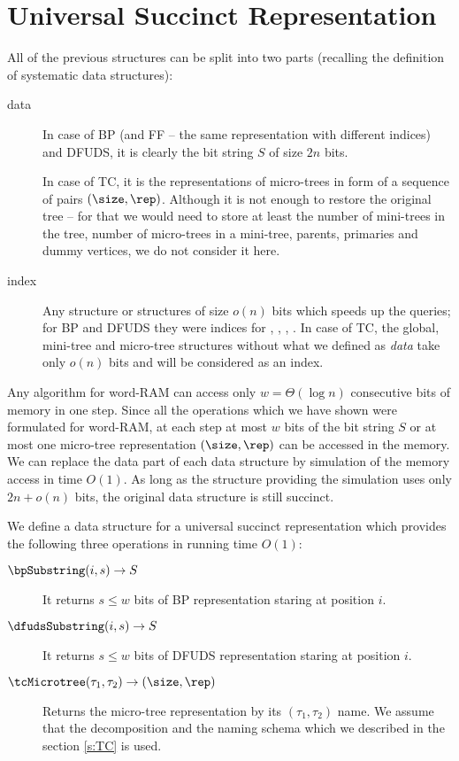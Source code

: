 \section{Universal Succinct Representation}

All of the previous structures can be split into two parts (recalling the definition of systematic data structures):
\begin{description}
	\item[data]
	In case of BP (and FF -- the same representation with different indices) and DFUDS, it is clearly the bit string $S$ of size $2n$ bits.

	In case of TC, it is the representations of micro-trees in form of a sequence of pairs $(\size, \rep)$.
	Although it is not enough to restore the original tree -- for that we would need to store at least the number of mini-trees in the tree, number of micro-trees in a mini-tree, parents, primaries and dummy vertices, we do not consider it here.
	
	\item[index] 
	Any structure or structures of size $o(n)$ bits which speeds up the queries; for BP and DFUDS they were indices for \rank{}, \select{}, \match{}, \rmqi{}.
	In case of TC, the global, mini-tree and micro-tree structures without what we defined as \emph{data} take only $o(n)$ bits and will be considered as an index.
\end{description}

Any algorithm for word-RAM can access only $w = \Theta(\log n)$ consecutive bits of memory in one step.
Since all the operations which we have shown were formulated for word-RAM, at each step at most $w$ bits of the bit string $S$ or at most one micro-tree representation $(\size, \rep)$ can be accessed in the memory.
We can replace the data part of each data structure by simulation of the memory access in time $O(1)$.
As long as the structure providing the simulation uses only $2n + o(n)$ bits, the original data structure is still succinct.

We define a data structure for a universal succinct representation which provides the following three operations in running time $O(1)$:
\begin{description}
	\item[$\bpSubstring(i, s) \rightarrow S$]
	It returns $s \le w$ bits of BP representation staring at position $i$.
	
	\item[$\dfudsSubstring(i, s) \rightarrow S$] 
	It returns $s \le w$ bits of DFUDS representation staring at position $i$.
	
	\item[$\tcMicrotree(\tau_1, \tau_2) \rightarrow (\size, \rep)$]
	Returns the micro-tree representation by its $(\tau_1, \tau_2)$ name.
	We assume that the decomposition and the naming schema which we described in the section \ref{s:TC} is used.
\end{description}


